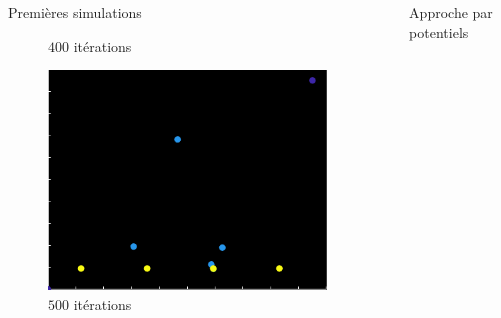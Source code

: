 \documentclass[final,hyperref={pdfpagelabels=false}]{beamer}
\begin{document}
\begin{frame}[t]
\begin{columns}[t]
\begin{column}{.465\textwidth}
\begin{block}{{\Large Premi\`eres simulations}}
\begin{figure}[h!]
\begin{minipage}[b]{0.50\linewidth}
      \caption{\text{ } $400$ it\'erations}
   \end{minipage}\hfill
   \begin{minipage}[b]{0.50\linewidth}   
      \centering \includegraphics[scale=1.4]{simu_500.png}
      \caption{\text{ } $500$ it\'erations}
   \end{minipage}
   
\end{figure}

\end{block}


\end{column} %

\begin{column}{.03\textwidth}\end{column} %
 
\begin{column}{.465\textwidth} %


\begin{block}{{\Large Approche par potentiels}}


\end{block}
\end{column}
\end{columns}
\end{frame}
\end{document}
